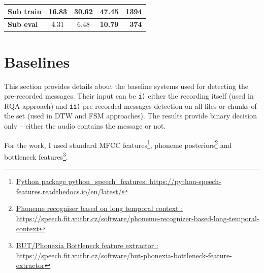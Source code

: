\documentclass{ExcelAtFIT}
\begin{document}
\begin{table}[hbt]
{\begin{tabular}{l|cccr}
\hline
\textbf{Sub train}                                                                & 16.83                                                                                            & 30.62                                                                                                      & \textbf{47.45}                                                             & \textbf{1394}                                                                                                            \\ 
\hline
\textbf{Sub eval}                                                                 & 4.31                                                                                             & 6.48                                                                                                       & \textbf{10.79}                                                             & \textbf{374}                                                                                                             \\
\bottomrule
\end{tabular}
}

\end{table}



\section{Baselines}
This section provides details about the baseline systems used for detecting the pre-recorded messages. Their input can be \texttt{i)} either the recording itself (used in RQA approach) and \texttt{ii)} pre-recorded messages detection on all files or chunks of the set (used in DTW and FSM approaches).
The results provide binary decision only – either the audio contains the message or not.

For the work, I used standard MFCC features\footnote{\href{https://python-speech-features.readthedocs.io/en/latest/}{Python package python\_speech\_features: https://python-speech-features.readthedocs.io/en/latest/}}, phoneme posteriors\footnote{\href{https://speech.fit.vutbr.cz/software/phoneme-recognizer-based-long-temporal-context}{Phoneme recogniser based on long temporal context \cite{SchwarzPhonerec}: https://speech.fit.vutbr.cz/software/phoneme-recognizer-based-long-temporal-context}} and bottleneck features\footnote{\href{https://speech.fit.vutbr.cz/software/but-phonexia-bottleneck-feature-extractor}{BUT/Phonexia Bottleneck feature extractor \cite{BottleneckExtractor}: https://speech.fit.vutbr.cz/software/but-phonexia-bottleneck-feature-extractor}}.
\end{document}
